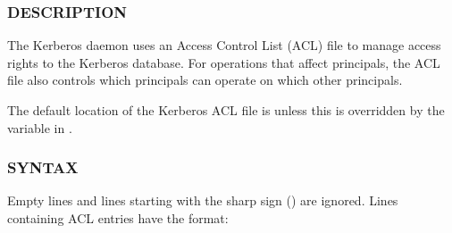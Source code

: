 \documentclass[letterpaper,10pt,english]{sphinxmanual}
\begin{document}
\subsubsection{DESCRIPTION}
\label{\detokenize{admin/conf_files/kadm5_acl:description}}
\sphinxAtStartPar
The Kerberos {\hyperref[\detokenize{admin/admin_commands/kadmind:kadmind-8}]{}} daemon uses an Access Control List
(ACL) file to manage access rights to the Kerberos database.
For operations that affect principals, the ACL file also controls
which principals can operate on which other principals.

\sphinxAtStartPar
The default location of the Kerberos ACL file is
{\hyperref[\detokenize{mitK5defaults:paths}]{}}  unless this is overridden by the 
variable in {\hyperref[\detokenize{admin/conf_files/kdc_conf:kdc-conf-5}]{}}.


\subsubsection{SYNTAX}
\label{\detokenize{admin/conf_files/kadm5_acl:syntax}}
\sphinxAtStartPar
Empty lines and lines starting with the sharp sign (\sphinxcode{\sphinxupquote{\#}}) are
ignored.  Lines containing ACL entries have the format:

\begin{sphinxVerbatim}[commandchars=\\\{\}]
    \PYG{p}{[}  \PYG{p}{[}\PYG{p}{]} \PYG{p}{]}
\end{sphinxVerbatim}
\end{document}

